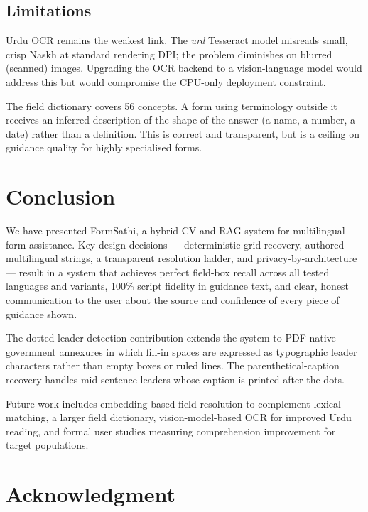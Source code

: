 \documentclass[conference]{IEEEtran}
\begin{document}
\subsection{Limitations}

Urdu OCR remains the weakest link. The \textit{urd} Tesseract model misreads small, crisp Naskh at standard rendering DPI; the problem diminishes on blurred (scanned) images. Upgrading the OCR backend to a vision-language model would address this but would compromise the CPU-only deployment constraint.

The field dictionary covers 56 concepts. A form using terminology outside it receives an inferred description of the shape of the answer (a name, a number, a date) rather than a definition. This is correct and transparent, but is a ceiling on guidance quality for highly specialised forms.

\section{Conclusion}
\label{sec:conclusion}

We have presented FormSathi, a hybrid CV and RAG system for multilingual form assistance. Key design decisions — deterministic grid recovery, authored multilingual strings, a transparent resolution ladder, and privacy-by-architecture — result in a system that achieves perfect field-box recall across all tested languages and variants, 100\% script fidelity in guidance text, and clear, honest communication to the user about the source and confidence of every piece of guidance shown.

The dotted-leader detection contribution extends the system to PDF-native government annexures in which fill-in spaces are expressed as typographic leader characters rather than empty boxes or ruled lines. The parenthetical-caption recovery handles mid-sentence leaders whose caption is printed after the dots.

Future work includes embedding-based field resolution to complement lexical matching, a larger field dictionary, vision-model-based OCR for improved Urdu reading, and formal user studies measuring comprehension improvement for target populations.

\section*{Acknowledgment}
\end{document}
